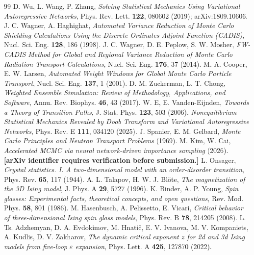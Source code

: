 \documentclass[11pt,a4paper]{article}
\begin{document}
\begin{thebibliography}{99}
 D. Wu, L. Wang, P. Zhang, \emph{Solving Statistical Mechanics Using Variational
Autoregressive Networks}, Phys. Rev. Lett. \textbf{122}, 080602 (2019); arXiv:1809.10606.
 J. C. Wagner, A. Haghighat, \emph{Automated Variance Reduction of Monte
Carlo Shielding Calculations Using the Discrete Ordinates Adjoint Function (CADIS)},
Nucl. Sci. Eng. \textbf{128}, 186 (1998).
 J. C. Wagner, D. E. Peplow, S. W. Mosher, \emph{FW-CADIS Method for Global
and Regional Variance Reduction of Monte Carlo Radiation Transport Calculations},
Nucl. Sci. Eng. \textbf{176}, 37 (2014).
 M. A. Cooper, E. W. Larsen, \emph{Automated Weight Windows for Global Monte
Carlo Particle Transport}, Nucl. Sci. Eng. \textbf{137}, 1 (2001).
 D. M. Zuckerman, L. T. Chong, \emph{Weighted Ensemble Simulation: Review
of Methodology, Applications, and Software}, Annu. Rev. Biophys. \textbf{46}, 43 (2017).
 W. E, E. Vanden-Eijnden, \emph{Towards a Theory of Transition Paths},
J. Stat. Phys. \textbf{123}, 503 (2006).
 \emph{Nonequilibrium Statistical Mechanics Revealed by Doob Transform and
Variational Autoregressive Networks}, Phys. Rev. E \textbf{111}, 034120 (2025).
 J. Spanier, E. M. Gelbard, \emph{Monte Carlo Principles and Neutron Transport
Problems} (1969).
 M. Kim, W. Cai, \emph{Accelerated MCMC via neural network-driven importance
sampling} (2026). \textbf{[arXiv identifier requires verification before submission.]}
 L. Onsager, \emph{Crystal statistics. I. A two-dimensional model with an
order-disorder transition}, Phys. Rev. \textbf{65}, 117 (1944).
 A. L. Talapov, H. W. J. Bl\"ote, \emph{The magnetization of the 3D Ising
model}, J. Phys. A \textbf{29}, 5727 (1996).
 K. Binder, A. P. Young, \emph{Spin glasses: Experimental facts,
theoretical concepts, and open questions}, Rev. Mod. Phys. \textbf{58}, 801 (1986).
 M. Hasenbusch, A. Pelissetto, E. Vicari, \emph{Critical behavior of
three-dimensional Ising spin glass models}, Phys. Rev. B \textbf{78}, 214205 (2008).
 L. Ts. Adzhemyan, D. A. Evdokimov, M. Hnati\v{c}, E. V. Ivanova,
M. V. Kompaniets, A. Kudlis, D. V. Zakharov, \emph{The dynamic critical exponent $z$ for 2d and
3d Ising models from five-loop $\varepsilon$ expansion}, Phys. Lett. A \textbf{425}, 127870
(2022).
\end{thebibliography}
\end{document}
